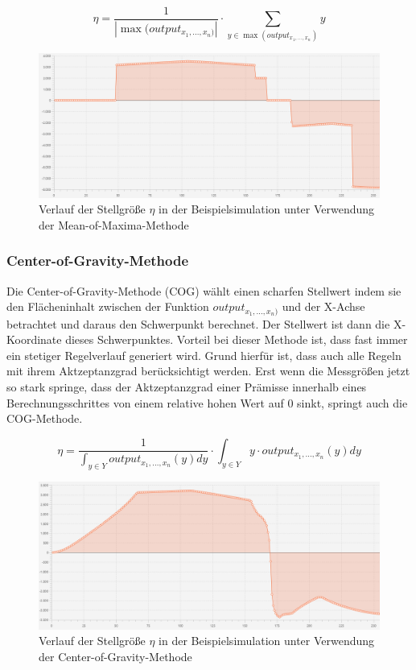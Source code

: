 \documentclass[12pt,a4paper,bibliography=totocnumbered,listof=totocnumbered]{scrartcl}
\theoremstyle{Umgebung}
\begin{document}
\begin{equation}
\eta = \frac{1}{ | \max(output_{x_1,..., x_n)} | } \cdot \sum_{y\in \max(output_{x_1,..., x_n})} y
\end{equation}

\begin{figure}
	\centering
	\includegraphics[width=0.8\linewidth]{img/defuzzy/mom3}
	\caption{Verlauf der Stellgröße $\eta$ in der Beispielsimulation unter Verwendung der Mean-of-Maxima-Methode}
	\label{fig:mom}
\end{figure}

\subsubsection{Center-of-Gravity-Methode}

Die Center-of-Gravity-Methode (COG) wählt einen scharfen Stellwert indem sie den Flächeninhalt zwischen der Funktion $output_{x_1,..., x_n)}$ und der X-Achse betrachtet und daraus den Schwerpunkt berechnet. Der Stellwert ist dann die X-Koordinate dieses Schwerpunktes. Vorteil bei dieser Methode ist, dass fast immer ein stetiger Regelverlauf generiert wird. Grund hierfür ist, dass auch alle Regeln mit ihrem Aktzeptanzgrad berücksichtigt werden. Erst wenn die Messgrößen jetzt so stark springe, dass der Aktzeptanzgrad einer Prämisse innerhalb eines Berechnungsschrittes von einem relative hohen Wert auf 0 sinkt, springt auch die COG-Methode.

\begin{equation}
\eta = \frac{1}{\int_{y \in Y} output_{x_1,..., x_n}(y) dy} \cdot \int_{y \in Y} y \cdot output_{x_1,..., x_n}(y)dy
\end{equation}

\begin{figure}
	\centering
	\includegraphics[width=0.8\linewidth]{img/defuzzy/center1}
	\caption{Verlauf der Stellgröße $\eta$ in der Beispielsimulation unter Verwendung der Center-of-Gravity-Methode}
	\label{fig:cog}
\end{figure}
\end{document}
